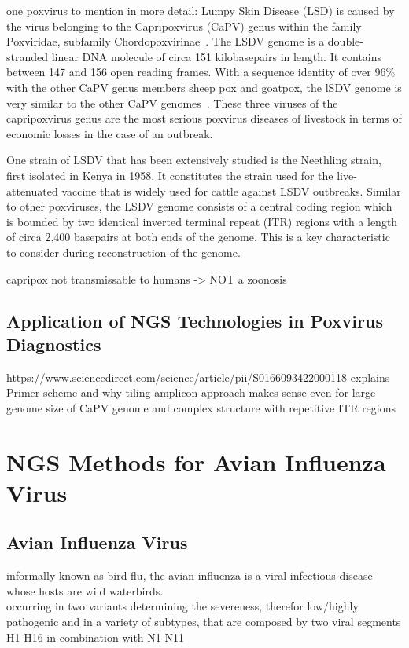 one poxvirus to mention in more detail:
Lumpy Skin Disease (LSD) is caused by the virus belonging to the Capripoxvirus (CaPV) genus within the family Poxviridae, subfamily Chordopoxvirinae~\cite{walker2019changes}. The LSDV genome is a double-stranded linear DNA molecule of circa 151 kilobasepairs in length. It contains between 147 and 156 open reading frames. With a sequence identity of over 96\% with the other CaPV genus members sheep pox and goatpox, the lSDV genome is very similar to the other CaPV genomes~\cite{tulman2001genome}. These three viruses of the capripoxvirus genus are the most serious poxvirus diseases of livestock in terms of economic losses in the case of an outbreak. 

One strain of LSDV that has been extensively studied is the Neethling strain, first isolated in Kenya in 1958. It constitutes the strain used for the live-attenuated vaccine that is widely used for cattle against LSDV outbreaks. Similar to other poxviruses, the LSDV genome consists of a central coding region which is bounded by two identical inverted terminal repeat (ITR) regions with a length of circa 2,400 basepairs at both ends of the genome. This is a key characteristic to consider during reconstruction of the genome. 

capripox not transmissable to humans -> NOT a zoonosis

\subsection{Application of NGS Technologies in Poxvirus Diagnostics}

https://www.sciencedirect.com/science/article/pii/S0166093422000118 explains Primer scheme and why tiling amplicon approach makes sense even for large genome size of CaPV genome and complex structure with repetitive ITR regions


\section{NGS Methods for Avian Influenza Virus}\label{sec:AIV}
\subsection{Avian Influenza Virus}

informally known as bird flu, the avian influenza is a viral infectious disease whose hosts are wild waterbirds. \\
occurring in two variants determining the severeness, therefor low/highly pathogenic and in a variety of subtypes, that are composed by two viral segments H1-H16 in combination with N1-N11 \\

